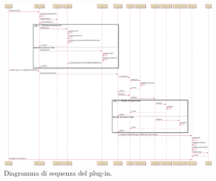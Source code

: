 \documentclass[../manuale-sviluppatore.tex]{subfiles}
\begin{document}
\begin{figure}[H]
  \centering
  \includegraphics[width=15cm]{img/plugin/sequenceDiagramPlug.png}
  \caption{Diagramma di sequenza del plug-in.}
\end{figure}
\end{document}

